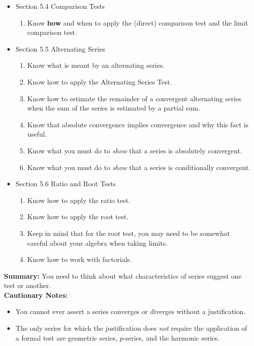 \documentclass[11pt,fleqn]{article}
\begin{document}
\begin{itemize}
\begin{itemize}
	\item Section 5.4 Comparison Tests\\

		\begin{enumerate}
		\item Know \textbf{how} and when to apply the (direct) comparison test and the limit comparison test.\\
		\end{enumerate}

	\item Section 5.5 Alternating Series \\

		\begin{enumerate}
		\item Know what is meant by an alternating series.
		\item Know how to apply the Alternating Series Test.
		\item Know how to estimate the remainder of a convergent alternating series when the sum of the series is estimated by a partial sum.
		\item Know that absolute convergence implies convergence and why this fact is useful.
		\item Know what you must do to \emph{show} that a series is absolutely convergent.
		\item Know what you must do to \emph{show} that a series is conditionally convergent.\\
		\end{enumerate}

	\item Section 5.6 Ratio and Root Tests\\

		\begin{enumerate}
		\item Know how to apply the ratio test.
		\item Know how to apply the root test.
		\item Keep in mind that for the root test, you may need to  be somewhat careful about your algebra when taking limits.
		\item Know how to work with factorials.
		\end{enumerate}
	\end{itemize}
	
\textbf{Summary:} You need to think about what characteristics of series suggest one test or another. \\

\textbf{Cautionary Notes:}
	\begin{itemize}
	\item You cannot ever assert a series converges or diverges without a justification.
	\item The only series for which the justification does \emph{not} require the application of a formal test are geometric series, $p$-series, and the harmonic series.
	\end{itemize}

\end{itemize}
\end{document}
